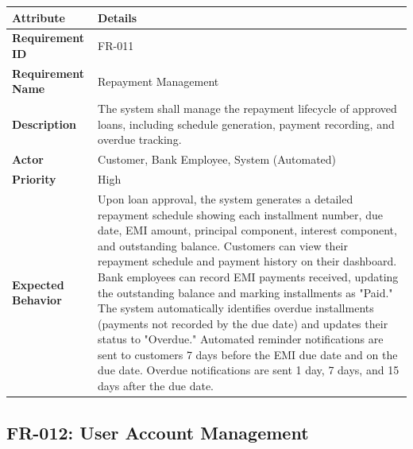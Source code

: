 \documentclass[12pt,a4paper,oneside]{report}
\begin{document}
\begin{table}[htbp]
\centering
\small
\begin{tabularx}{\textwidth}{l l}
\toprule
\textbf{Attribute} & \textbf{Details} \\
\midrule
\textbf{Requirement ID} & FR-011 \\
\textbf{Requirement Name} & Repayment Management \\
\textbf{Description} & The system shall manage the repayment lifecycle of approved loans, including schedule generation, payment recording, and overdue tracking. \\
\textbf{Actor} & Customer, Bank Employee, System (Automated) \\
\textbf{Priority} & High \\
\textbf{Expected Behavior} & Upon loan approval, the system generates a detailed repayment schedule showing each installment number, due date, EMI amount, principal component, interest component, and outstanding balance. Customers can view their repayment schedule and payment history on their dashboard. Bank employees can record EMI payments received, updating the outstanding balance and marking installments as "Paid." The system automatically identifies overdue installments (payments not recorded by the due date) and updates their status to "Overdue." Automated reminder notifications are sent to customers 7 days before the EMI due date and on the due date. Overdue notifications are sent 1 day, 7 days, and 15 days after the due date. \\
\bottomrule
\end{tabularx}
\end{table}

\subsection{FR-012: User Account Management}
\end{document}
